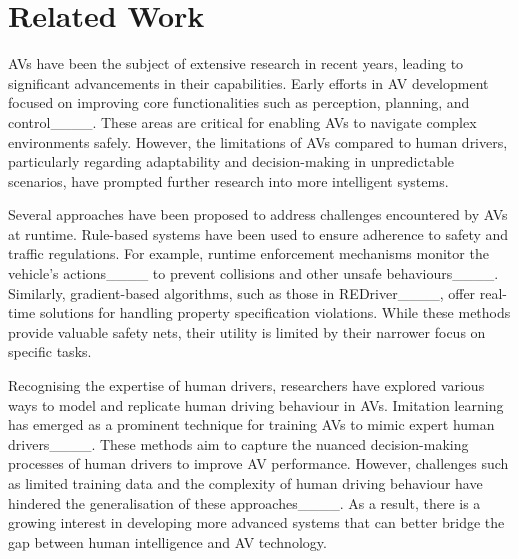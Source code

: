 \section{Related Work}
\label{sec:related}
AVs have been the subject of extensive research in recent years, leading to significant advancements in their capabilities. Early efforts in AV development focused on improving core functionalities such as perception, planning, and control____. These areas are critical for enabling AVs to navigate complex environments safely. However, the limitations of AVs compared to human drivers, particularly regarding adaptability and decision-making in unpredictable scenarios, have prompted further research into more intelligent systems.


Several approaches have been proposed to address challenges encountered by AVs at runtime. Rule-based systems have been used to ensure adherence to safety and traffic regulations. For example, runtime enforcement mechanisms monitor the vehicle's actions____ to prevent collisions and other unsafe behaviours____. Similarly, gradient-based algorithms, such as those in REDriver____, offer real-time solutions for handling property specification violations. While these methods provide valuable safety nets, their utility is limited by their narrower focus on specific tasks.

Recognising the expertise of human drivers, researchers have explored various ways to model and replicate human driving behaviour in AVs. Imitation learning has emerged as a prominent technique for training AVs to mimic expert human drivers____. These methods aim to capture the nuanced decision-making processes of human drivers to improve AV performance. However, challenges such as limited training data and the complexity of human driving behaviour have hindered the generalisation of these approaches____. As a result, there is a growing interest in developing more advanced systems that can better bridge the gap between human intelligence and AV technology.

